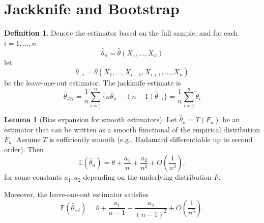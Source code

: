 \documentclass[11pt]{article}
\theoremstyle{definition}
\newtheorem{defn}{Definition}[section]
\newtheorem{lemma}{Lemma}[section]
\begin{document}
\section{Jackknife and Bootstrap}
\begin{defn}
Denote the estimator based on the full sample, and for each \(i=1,\dots,n\)
    \[
\hat\theta_n=\hat\theta(X_1,\dots,X_n)
\]
let
\[
\hat\theta_{-i}
=
\hat\theta(X_1,\dots,X_{i-1},X_{i+1},\dots,X_n)
\]
be the leave-one-out estimator. The jackknife estimate is
\[
\hat\theta_{JK}
=\frac{1}{n}\sum_{i=1}^{n}
\{n\hat\theta_n-(n-1)\hat\theta_{-i}\} = \frac{1}{n}\sum_{i=1}^n\tilde \theta_i
\]
\end{defn}

\begin{lemma}[Bias expansion for smooth estimators]
Let \(\hat\theta_n = T(F_n)\) be an estimator that can be written as a smooth functional of the empirical distribution \(F_n\). Assume \(T\) is sufficiently smooth (e.g., Hadamard differentiable up to second order). Then
\[
\mathbb E(\hat\theta_n)
=
\theta + \frac{a_1}{n} + \frac{a_2}{n^2} + O\!\left(\frac{1}{n^3}\right),
\]
for some constants \(a_1, a_2\) depending on the underlying distribution \(F\).

Moreover, the leave-one-out estimator satisfies
\[
\mathbb E(\hat\theta_{-i})
=
\theta + \frac{a_1}{n-1} + \frac{a_2}{(n-1)^2} + O\!\left(\frac{1}{n^3}\right).
\]
\end{lemma}
\end{document}
